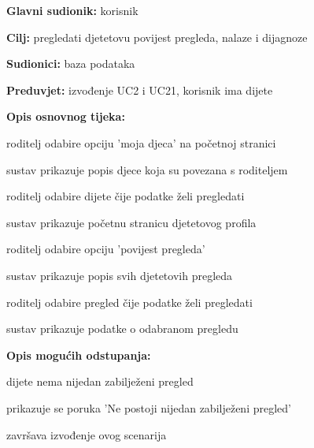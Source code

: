                     \noindent {}
					\begin{packed_item}
	
						\item \textbf{Glavni sudionik: }korisnik
						\item  \textbf{Cilj:} pregledati djetetovu povijest pregleda, nalaze i dijagnoze
						\item  \textbf{Sudionici:} baza podataka
						\item  \textbf{Preduvjet:} izvođenje UC2 i UC21, korisnik ima dijete
						\item  \textbf{Opis osnovnog tijeka:}
						
						\item[] \begin{packed_enum}
		
							\item roditelj odabire opciju 'moja djeca' na početnoj stranici
							\item sustav prikazuje popis djece koja su povezana s roditeljem
							\item roditelj odabire dijete čije podatke želi pregledati
							\item sustav prikazuje početnu stranicu djetetovog profila
							\item roditelj odabire opciju 'povijest pregleda'
							\item sustav prikazuje popis svih djetetovih pregleda
							\item roditelj odabire pregled čije podatke želi pregledati
							\item sustav prikazuje podatke o odabranom pregledu
						\end{packed_enum}
						\item  \textbf{Opis mogućih odstupanja:}
						
						\item[] \begin{packed_item}
							\item[6.a] dijete nema nijedan zabilježeni pregled
							\item[] 
							\begin{packed_enum} 
								\item prikazuje se poruka 'Ne postoji nijedan zabilježeni pregled'
								\item završava izvođenje ovog scenarija
								
							\end{packed_enum}
						\end{packed_item}
					\end{packed_item}

